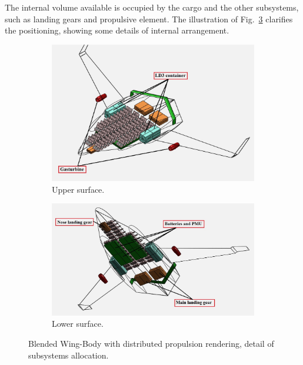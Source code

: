 The internal volume available is occupied by the cargo and the other subsystems, such as landing gears and propulsive element. 
The illustration of Fig.~\ref{fig:bwb_dep_render_detail} clarifies the positioning, showing some details of internal arrangement.
\begin{figure}[!h]
	\centering
	\begin{subfigure}{0.6\textwidth}
		\centering
		\includegraphics[keepaspectratio, width=\linewidth]{images/chap4/bwb_dep_render_upper.jpg}
		\caption{Upper surface.}
		\label{fig:bwb_dep_render_upper}
	\end{subfigure}
	\begin{subfigure}{0.6\textwidth}
		\centering
		\includegraphics[keepaspectratio, width=\linewidth]{images/chap4/bwb_dep_render_lower.jpg}
		\caption{Lower surface.}
		\label{fig:bwb_dep_render_lower}
	\end{subfigure}
	\caption{Blended Wing-Body with distributed propulsion rendering, detail of subsystems allocation.}
	\label{fig:bwb_dep_render_detail}
\end{figure}

